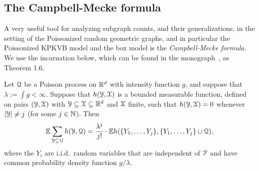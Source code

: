 \subsection{The Campbell-Mecke formula}


A very useful tool for analyzing subgraph counts, and their generalizations, in the 
setting of the Poissonized random geometric graphs, and in particular the Poissonized KPKVB model and the box model is the \emph{Campbell-Mecke formula}.
We use the incarnation below, which can be found in the monograph~\cite{penrose2003random}, as Theorem 1.6.


\begin{theorem}\label{thm:palm}
Let ${\mathcal Q}$ be a Poisson process on ${\mathbb R}^d$ with intensity function $g$, and suppose that $\lambda := \int g < \infty$.
Suppose that $h({\mathcal Y}, {\mathcal X})$ is a bounded measurable function, defined on pairs $({\mathcal Y},{\mathcal X})$ with ${\mathcal Y} \subseteq {\mathcal X} \subseteq {\mathbb R}^d$
and ${\mathcal X}$ finite, such that $h({\mathcal Y},{\mathcal X}) = 0$ whenever $|{\mathcal Y}| \neq j$ (for some $j \in {\mathbb N}$).
Then
\[ {\mathbb E} \sum_{{\mathcal Y} \subseteq {\mathcal Q}} h( {\mathcal Y}, {\mathcal Q}) = \frac{\lambda^j}{j!} \cdot {\mathbb E} h(\{Y_1,\dots, Y_j\}, \{Y_1,\dots, Y_j\} \cup {\mathcal Q} ), \]
\noindent
where the $Y_i$ are i.i.d.~random variables that are independent of ${\mathcal P}$ and have common probability density function
$g/\lambda$.
\end{theorem}

% 
% 


